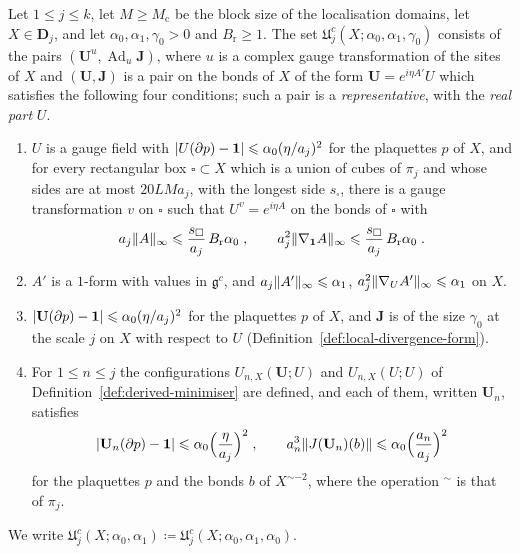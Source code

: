 \documentclass[11pt]{preprint}
\newcommand{\id}{\mathbf 1}
\newcommand{\Ad}{\operatorname{Ad}}
\DeclarePairedDelimiter{\abs}{\lvert}{\rvert}
\DeclarePairedDelimiter{\norm}{\lVert}{\rVert}
\numberwithin{equation}{section}
\begin{document}
\begin{definition}\label{def:pair-space}
Let $1 \leqslant j \leqslant k$, let $M \geqslant M_{\mathrm c}$ be the block size of the localisation domains, let $X \in \mathbf D_j$, and let $\alpha_0, \alpha_1, \gamma_0 > 0$ and $B_{\mathrm r} \geqslant 1$. The set $\mathfrak U^{c}_j(X; \alpha_0, \alpha_1, \gamma_0)$ consists of the pairs $(\mathbf U^u, \Ad_u\mathbf J)$, where $u$ is a complex gauge transformation of the sites of $X$ and $(\mathbf U, \mathbf J)$ is a pair on the bonds of $X$ of the form $\mathbf U = e^{i\eta A'}U$ which satisfies the following four conditions; such a pair is a \emph{representative}, with the \emph{real part} $U$.
\begin{enumerate}[label=(\roman*)]
\item $U$ is a gauge field with $\abs{U(\partial p) - \id} \leqslant \alpha_0(\eta/a_j)^2$ for the plaquettes $p$ of $X$, and for every rectangular box $\square \subset X$ which is a union of cubes of $\pi_j$ and whose sides are at most $20LMa_j$, with the longest side $s_\square$, there is a gauge transformation $v$ on $\square$ such that $U^v = e^{i\eta A}$ on the bonds of $\square$ with
\begin{equation}\label{eq:pair-space-real}
    a_j\norm A_\infty\leqslant \frac{s_\square}{a_j}\,B_{\mathrm r}\alpha_0\;,
    \qquad
    a_j^2\norm{\nabla_{\id}A}_\infty \leqslant \frac{s_\square}{a_j}\,B_{\mathrm r}\alpha_0\;.
\end{equation}
\item $A'$ is a $1$-form with values in $\mathfrak g^c$, and $a_j\norm{A'}_\infty \leqslant \alpha_1$, $a_j^2\norm{\nabla_UA'}_\infty \leqslant \alpha_1$ on $X$.
\item $\abs{\mathbf U(\partial p) - \id} \leqslant \alpha_0(\eta/a_j)^2$ for the plaquettes $p$ of $X$, and $\mathbf J$ is of the size $\gamma_0$ at the scale $j$ on $X$ with respect to $U$ (Definition~\ref{def:local-divergence-form}).
\item For $1 \leqslant n \leqslant j$ the configurations $U_{n,X}(\mathbf U; U)$ and $U_{n,X}(U; U)$ of Definition~\ref{def:derived-minimiser} are defined, and each of them, written $\mathbf U_n$, satisfies
\begin{equation}\label{eq:pair-space-derived}
    \abs{\mathbf U_n(\partial p) - \id} \leqslant \alpha_0\Bigl(\frac{\eta}{a_j}\Bigr)^2\;,
    \qquad
    a_n^3\norm{J(\mathbf U_n)(b)} \leqslant \alpha_0\Bigl(\frac{a_n}{a_j}\Bigr)^2
\end{equation}
for the plaquettes $p$ and the bonds $b$ of $X^{\sim-2}$, where the operation ${}^\sim$ is that of $\pi_j$.
\end{enumerate}
We write $\mathfrak U^c_j(X; \alpha_0, \alpha_1) \coloneqq \mathfrak U^c_j(X; \alpha_0, \alpha_1, \alpha_0)$.
\end{definition}
\end{document}
